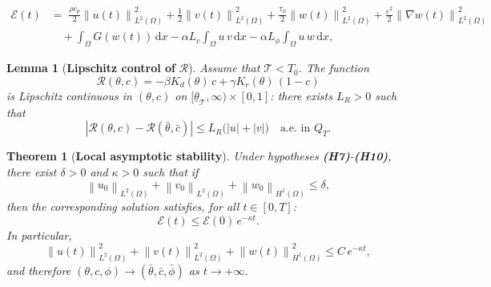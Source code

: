 \documentclass[10pt,a4paper]{amsart}
\newtheorem{lemma}{Lemma}
\newtheorem{theorem}{Theorem}
\newcommand{\dx}{\,\mathrm{d}x}
\newcommand{\norm}[1]{\left\|#1\right\|}
\begin{document}
	\begin{equation}
		\label{eq:energy}
		\begin{aligned}
			\mathcal{E}(t) & = \;
			\frac{\rho c_p}{2}\norm{u(t)}_{L^2(\Omega)}^2
			+ \frac12\norm{v(t)}_{L^2(\Omega)}^2
			+ \frac{\tau_\phi}{2}\norm{w(t)}_{L^2(\Omega)}^2
			+ \frac{\varepsilon^2}{2}\norm{\nabla w(t)}_{L^2(\Omega)}^2 \\
			&\quad + \int_\Omega G(w(t))\dx
			- \alpha L_c \int_\Omega u\,v\dx
			- \alpha L_\phi \int_\Omega u\,w\dx,
		\end{aligned}
	\end{equation}

	\begin{lemma}[\textbf{Lipschitz control of} $\mathcal{R}$]
		\label{lem:lipschitzR}
		Assume that $\mathcal T<T_0$. The function
		$$\mathcal{R}(\theta,c) = -\beta K_d(\theta)\,c + \gamma K_r(\theta)\,(1-c)$$
		is Lipschitz continuous in $(\theta, c)$ on $[\underline\theta_{\mathcal{T}}, \infty) \times [0,1]$: there
		exists $L_R > 0$ such that
		\[
		|\mathcal{R}(\theta,c) - \mathcal{R}(\bar\theta,\bar c)|
		\leq L_R\bigl(|u| + |v|\bigr)
		\quad\text{a.e. in } Q_T.
		\]
	\end{lemma}

	\begin{theorem}[\textbf{Local asymptotic stability}]
		\label{thm:stability}
		Under hypotheses \textup{\textbf{(H7)}}-\textup{\textbf{(H10)}}, there exist $\delta > 0$ and $\kappa > 0$ such
		that if
		\[
		\norm{u_0}_{L^2(\Omega)} + \norm{v_0}_{L^2(\Omega)} + \norm{w_0}_{H^1(\Omega)} \leq \delta,
		\]
		then the corresponding solution satisfies, for all $t \in [0, T]$:
		\[
		\mathcal{E}(t) \leq \mathcal{E}(0)\,e^{-\kappa t}.
		\]
		In particular,
		\[
		\norm{u(t)}_{L^2(\Omega)}^2 + \norm{v(t)}_{L^2(\Omega)}^2 + \norm{w(t)}_{H^1(\Omega)}^2
		\leq C\,e^{-\kappa t},
		\]
		and therefore $(\theta, c, \phi) \to (\bar\theta, \bar c, \bar\phi)$ as $t \to +\infty$.
	\end{theorem}
\end{document}
